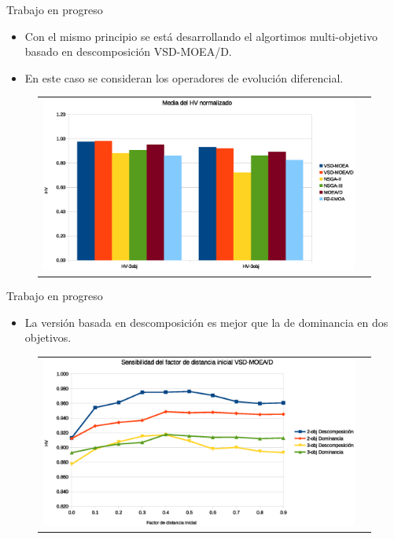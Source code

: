 \documentclass{beamer}
\begin{document}
\begin{frame}{Trabajo en progreso}
\begin{itemize}
\scriptsize
    \item Con el mismo principio se está desarrollando el algortimos multi-objetivo basado en descomposición VSD-MOEA/D.
    \item En este caso se consideran los operadores de evolución diferencial.
\end{itemize}
\begin{figure}
\centering
\begin{tabular}{cc}
\includegraphics[scale=0.4]{Images/general_mean_HV.eps} 
\end{tabular}
\end{figure}
\end{frame}

\begin{frame}{Trabajo en progreso}
\begin{itemize}
    \item La versión basada en descomposición es mejor que la de dominancia en dos objetivos.
\end{itemize}
\begin{figure}
\centering
\begin{tabular}{cc}
\includegraphics[scale=0.4]{Images/factor_inicial.eps} 
\end{tabular}
\end{figure}

\end{frame}
\end{document}

